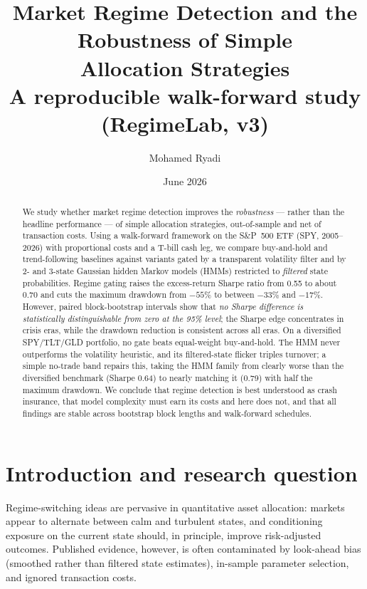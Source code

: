 \documentclass[11pt]{article}
\title{Market Regime Detection and the Robustness of Simple\\
Allocation Strategies\\[0.6em]
\large A reproducible walk-forward study (RegimeLab, v3)}
\author{Mohamed Ryadi}
\date{June 2026}
\begin{document}
\maketitle

\begin{abstract}
\noindent
We study whether market regime detection improves the \emph{robustness} ---
rather than the headline performance --- of simple allocation strategies,
out-of-sample and net of transaction costs. Using a walk-forward framework on
the S\&P~500 ETF (SPY, 2005--2026) with proportional costs and a T-bill cash
leg, we compare buy-and-hold and trend-following baselines against variants
gated by a transparent volatility filter and by 2- and 3-state Gaussian hidden
Markov models (HMMs) restricted to \emph{filtered} state probabilities. Regime
gating raises the excess-return Sharpe ratio from 0.55 to about 0.70 and cuts
the maximum drawdown from $-55\%$ to between $-33\%$ and $-17\%$. However,
paired block-bootstrap intervals show that \emph{no Sharpe difference is
statistically distinguishable from zero at the 95\% level}; the Sharpe edge
concentrates in crisis eras, while the drawdown reduction is consistent across
all eras. On a diversified SPY/TLT/GLD portfolio, no gate beats equal-weight
buy-and-hold. The HMM never outperforms the volatility heuristic, and its
filtered-state flicker triples turnover; a simple no-trade band repairs this,
taking the HMM family from clearly worse than the diversified benchmark
(Sharpe 0.64) to nearly matching it (0.79) with half the maximum drawdown. We
conclude that regime detection is best understood as crash insurance, that
model complexity must earn its costs and here does not, and that all findings
are stable across bootstrap block lengths and walk-forward schedules.
\end{abstract}

\section{Introduction and research question}

Regime-switching ideas are pervasive in quantitative asset allocation:
markets appear to alternate between calm and turbulent states, and
conditioning exposure on the current state should, in principle, improve
risk-adjusted outcomes. Published evidence, however, is often contaminated by
look-ahead bias (smoothed rather than filtered state estimates), in-sample
parameter selection, and ignored transaction costs.
\end{document}
